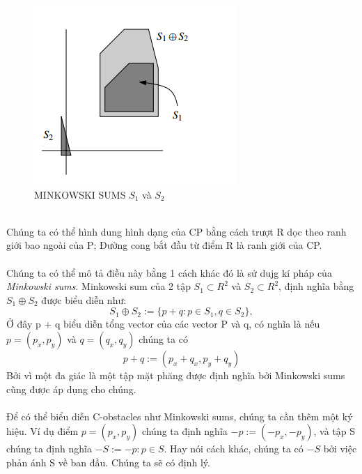 \documentclass[a4paper,12pt]{report}
\begin{document}
\begin{minipage}[b]{0.45\linewidth}
\begin{figure}[H]
\centering
\includegraphics[width=0.8\linewidth]{2.png}
\caption{MINKOWSKI SUMS $S_1$ và $S_2$}
\end{figure}
\end{minipage}
 \\
Chúng ta có thể hình dung hình dạng của CP bằng cách trượt R dọc theo ranh giới bao ngoài của P; Đường cong bắt đầu từ điểm R là ranh giới của CP. \\ \\
Chúng ta có thể mô tả điều này bằng 1 cách khác đó là sử dujg kí pháp của \textit{Minkowski sums}. Minkowski sum của 2 tập $S_1 \subset R^2$ và $S_2 \subset R^2$, định nghĩa bằng $S_1 \oplus S_2$ được biểu diễn như:
\begin{displaymath}
S_1 \oplus S_2 := \{ p + q: p \in S_1, q\in S_2\},
\end{displaymath}
Ở đây p + q biểu diễn tổng vector của các vector P và q, có nghĩa là nếu $p = (p_x,p_y)$ và $q = (q_x,q_y)$ chúng ta có
\begin{displaymath}
p + q := (p_x + q_x, p_y + q_y)
\end{displaymath}
Bởi vì một đa giác là một tập mặt phăng được  định nghĩa bởi Minkowski sums cũng được áp dụng cho chúng. \\ \\
Để có thể biểu diễn C-obstacles như Minkowski sums, chúng ta cần thêm một ký hiệu. Ví dụ điểm $p = (p_x,p_y)$ chúng ta định nghĩa $-p:= (-p_x,-p_y)$, và tập S chúng ta định nghĩa $-S:= {-p : p \in S}$. Hay nói cách khác, chúng ta có $-S$ bởi việc phản ánh S về ban đầu. Chúng ta sẽ có định lý.\\ \\
\end{document}

